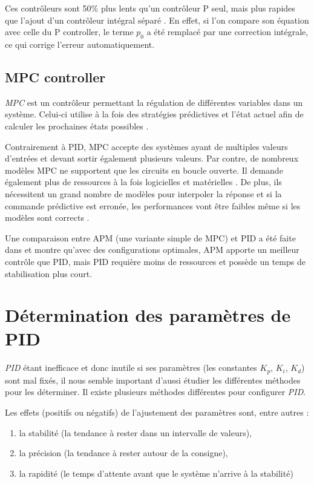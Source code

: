 \documentclass[a4paper,10pt]{report}
\begin{document}
Ces contrôleurs sont 50\% plus lents qu'un contrôleur P seul, mais plus rapides que l'ajout d'un contrôleur intégral séparé \cite{svrcek2014real}.
En effet, si l'on compare son équation avec celle du P controller, le terme $p_0$ a été remplacé par une correction intégrale, ce qui corrige l'erreur automatiquement.

\subsection{MPC controller}
\emph{MPC} est un contrôleur permettant la régulation de différentes variables dans un système.
Celui-ci utilise à la fois des stratégies prédictives et l'état actuel afin de calculer les prochaines états possibles \cite{RICHALET1978413}.

Contrairement à PID, MPC accepte des systèmes ayant de multiples valeurs d'entrées et devant sortir également plusieurs valeurs.
Par contre, de nombreux modèles MPC ne supportent que les circuits en boucle ouverte.
Il demande également plus de ressources à la fois logicielles et matérielles \cite{saletovic2014apm}.
De plus, ils nécessitent un grand nombre de modèles pour interpoler la réponse et si la commande prédictive est erronée, les performances vont être faibles même si les modèles sont corrects \cite{Richalet2016}.

Une comparaison entre APM (une variante simple de MPC) et PID a été faite dans \cite{saletovic2014apm} et montre qu'avec des configurations optimales, APM apporte un meilleur contrôle que PID, mais PID requière moins de ressources et possède un temps de stabilisation plus court.

\section{Détermination des paramètres de PID}

\emph{PID} étant inefficace et donc inutile si ses paramètres (les constantes $K_p$, $K_i$, $K_d$) sont mal fixés, il nous semble important d'aussi étudier les différentes méthodes pour les déterminer. Il existe plusieurs méthodes différentes pour configurer \emph{PID}.

Les effets (positifs ou négatifs) de l'ajustement des paramètres sont, entre autres \cite{zhong2006pid} :
\begin{enumerate}
\item la stabilité (la tendance à rester dans un intervalle de valeurs),
\item la précision (la tendance à rester autour de la consigne),
\item la rapidité (le temps d'attente avant que le système n'arrive à la stabilité)
\end{enumerate}
\end{document}
